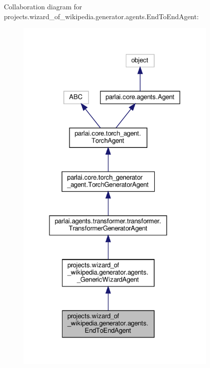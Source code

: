 Collaboration diagram for projects.\+wizard\+\_\+of\+\_\+wikipedia.\+generator.\+agents.\+End\+To\+End\+Agent\+:
\nopagebreak
\begin{figure}[H]
\begin{center}
\leavevmode
\includegraphics[width=280pt]{db/de1/classprojects_1_1wizard__of__wikipedia_1_1generator_1_1agents_1_1EndToEndAgent__coll__graph}
\end{center}
\end{figure}
